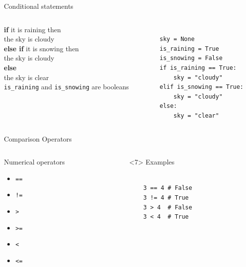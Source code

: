 \documentclass{beamer}
\begin{document}
\begin{frame}[fragile]{Conditional statements}
    \begin{columns}
        \begin{column}{0.5\textwidth}
            \textbf{if} it is raining then \\ 
            the sky is cloudy \\
            \textbf{else if} it is snowing then \\
            the sky is cloudy \\
            \textbf{else} \\
            the sky is clear \\
            \vspace*{1em}
            \texttt{is\_raining} and \texttt{is\_snowing} are booleans
        \end{column}
        \begin{column}{0.5\textwidth}
\begin{block}{}
\footnotesize
\begin{verbatim}

    sky = None
    is_raining = True
    is_snowing = False
    if is_raining == True:
        sky = "cloudy"
    elif is_snowing == True:
        sky = "cloudy"
    else:
        sky = "clear"
\end{verbatim}
\end{block}
        \end{column}
    \end{columns}
\end{frame}

\begin{frame}[fragile]{Comparison Operators}
    \begin{columns}
        \begin{column}{0.5\textwidth}
            Numerical operators
            \begin{itemize}[<+->]
                \item \texttt{==}
                \item \texttt{!=}
                \item \texttt{>}
                \item \texttt{>=}
                \item \texttt{<}
                \item \texttt{<=}
            \end{itemize}
        \end{column}
        \begin{column}{0.5\textwidth}
        \begin{block}<7>{}
        Examples
\begin{verbatim}

    3 == 4 # False 
    3 != 4 # True 
    3 > 4  # False 
    3 < 4  # True 
\end{verbatim}
        \end{block}
        \end{column}
    \end{columns}
\end{frame}
\end{document}
